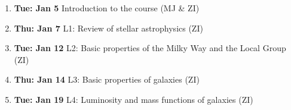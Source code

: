 \documentclass[10pt]{article}
\begin{document}
\vskip 0.2in
\begin{enumerate}
  \item {\bf Tue: Jan 5}   Introduction to the course  (MJ \& ZI) 
  \item {\bf Thu: Jan 7}     L1: Review of stellar astrophysics (ZI)

  \item {\bf Tue: Jan 12}    L2: Basic properties of the Milky Way and the Local Group (ZI)
  \item {\bf Thu: Jan 14}    L3: Basic properties of galaxies (ZI)

  \item {\bf Tue: Jan 19}    L4: Luminosity and mass functions of galaxies (ZI)


\end{enumerate}
\end{document}
